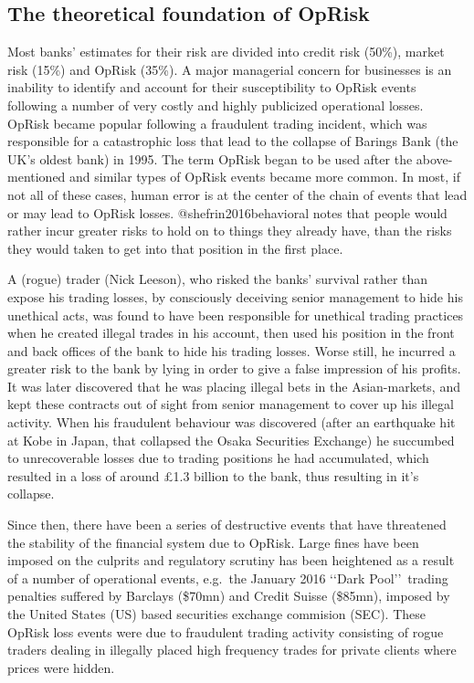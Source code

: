 \documentclass[]{article}
\begin{document}
\subsection{The theoretical foundation of OpRisk}

Most banks' estimates for their risk are divided into credit risk
(50\%), market risk (15\%) and OpRisk (35\%). A major managerial concern
for businesses is an inability to identify and account for their
susceptibility to OpRisk events following a number of very costly and
highly publicized operational losses. OpRisk became popular following a
fraudulent trading incident, which was responsible for a catastrophic
loss that lead to the collapse of Barings Bank (the UK's oldest bank) in
1995. The term OpRisk began to be used after the above-mentioned and
similar types of OpRisk events became more common. In most, if not all
of these cases, human error is at the center of the chain of events that
lead or may lead to OpRisk losses. @shefrin2016behavioral notes that
people would rather incur greater risks to hold on to things they
already have, than the risks they would taken to get into that position
in the first place.\medskip

A (rogue) trader (Nick Leeson), who risked the banks' survival rather
than expose his trading losses, by consciously deceiving senior
management to hide his unethical acts, was found to have been
responsible for unethical trading practices when he created illegal
trades in his account, then used his position in the front and back
offices of the bank to hide his trading losses. Worse still, he incurred
a greater risk to the bank by lying in order to give a false impression
of his profits. It was later discovered that he was placing illegal bets
in the Asian-markets, and kept these contracts out of sight from senior
management to cover up his illegal activity. When his fraudulent
behaviour was discovered (after an earthquake hit at Kobe in Japan, that
collapsed the Osaka Securities Exchange) he succumbed to unrecoverable
losses due to trading positions he had accumulated, which resulted in a
loss of around \pounds 1.3 billion to the bank, thus resulting in it's
collapse.\medskip

Since then, there have been a series of destructive events that have
threatened the stability of the financial system due to OpRisk. Large
fines have been imposed on the culprits and regulatory scrutiny has been
heightened as a result of a number of operational events, e.g.~the
January 2016 \lq\lq Dark Pool\rq\rq~trading penalties suffered by
Barclays (\$70mn) and Credit Suisse (\$85mn), imposed by the United
States (US) based securities exchange commision (SEC). These OpRisk loss
events were due to fraudulent trading activity consisting of rogue
traders dealing in illegally placed high frequency trades for private
clients where prices were hidden.\medskip 
\end{document}
